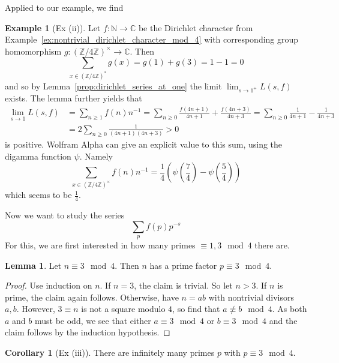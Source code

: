 \documentclass{scrartcl}
\newcommand{\N}{\mathbb{N}}
\newcommand{\Z}{\mathbb{Z}}
\newcommand{\C}{\mathbb{C}}
\newcommand{\units}{\times}
\theoremstyle{definition}
\newtheorem{lemma}[definition]{Lemma}
\newtheorem{example}[definition]{Example}
\newtheorem{corollary}[definition]{Corollary}
\begin{document}
Applied to our example, we find
\begin{example}[Ex (ii)]
    Let $f: \N \to \C$ be the Dirichlet character from Example~\ref{ex:nontrivial_dirichlet_character_mod_4} with corresponding group homomorphism $g: (\Z/4\Z)^\units \to \C$.
    Then
    \begin{equation*}
        \sum_{x \in (\Z/4\Z)^*} g(x) = g(1) + g(3) = 1 - 1 = 0
    \end{equation*}
    and so by Lemma~\ref{prop:dirichlet_series_at_one} the limit $\lim_{s \to 1^+} L(s, f)$ exists.
    The lemma further yields that
    \begin{align*}
        \lim_{s \to 1} L(s, f) &= \sum_{n \geq 1} f(n) n^{-1} = \sum_{n \geq 0} \frac {f(4n + 1)} {4n + 1} + \frac {f(4n + 3)} {4n + 3} = \sum_{n \geq 0} \frac 1 {4n + 1} - \frac 1 {4n + 3} \\
        &= 2 \sum_{n \geq 0} \frac 1 {(4n + 1)(4n + 3)} > 0
    \end{align*}
    is positive. 
    Wolfram Alpha \cite{wolfram_alpha} can give an explicit value to this sum, using the digamma function $\psi$. Namely
    \begin{equation*}
        \sum_{x \in (\Z/4\Z)^\units} f(n) n^{-1} = \frac 1 4 (\psi(\frac 7 4) - \psi(\frac 5 4))
    \end{equation*}
    which seems to be $\frac 1 4$.
\end{example}
Now we want to study the series
\begin{equation*}
    \sum_p f(p) p^{-s}
\end{equation*}
For this, we are first interested in how many primes $\equiv 1, 3 \mod 4$ there are.
\begin{lemma}
    \label{prop:prime_factor_3_mod_4}
    Let $n \equiv 3 \mod 4$. Then $n$ has a prime factor $p \equiv 3 \mod 4$.
\end{lemma}
\begin{proof}
    Use induction on $n$.
    If $n = 3$, the claim is trivial. 
    So let $n > 3$. If $n$ is prime, the claim again follows.
    Otherwise, have $n = ab$ with nontrivial divisors $a, b$.
    However, $3 \equiv n$ is not a square modulo $4$, so find that $a \not\equiv b \mod 4$.
    As both $a$ and $b$ must be odd, we see that either $a \equiv 3 \mod 4$ or $b \equiv 3 \mod 4$ and the claim follows by the induction hypothesis.
\end{proof}
\begin{corollary}[Ex (iii)]
    There are infinitely many primes $p$ with $p \equiv 3 \mod 4$.
\end{corollary}
\end{document}
